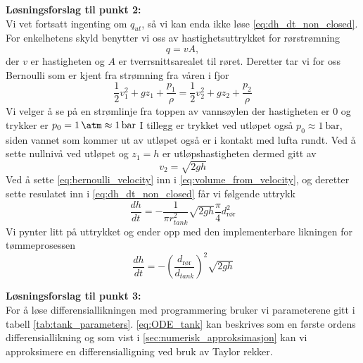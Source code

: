 \textbf{Løsningsforslag til punkt 2:} \\
Vi vet fortsatt ingenting om $q_{ut}$, så vi kan enda ikke løse \eqref{eq:dh_dt_non_closed}. For enkelhetens skyld benytter vi oss av hastighetsuttrykket for rørstrømning
\begin{equation}
    q = vA,
    \label{eq:volume_from_velocity}
\end{equation}
der $v$ er hastigheten og $A$ er tverrsnittsarealet til røret. Deretter tar vi for oss Bernoulli som er kjent fra strømning fra våren i fjor
\begin{equation}
    \frac{1}{2}v_1^2 + gz_1 + \frac{p_1}{\rho} = \frac{1}{2}v_2^2 + gz_2 + \frac{p_2}{\rho}
\end{equation}
Vi velger å se på en strømlinje fra toppen av vannsøylen der hastigheten er 0 og trykker er $p_0=\SI{1}{\atm}\approx \SI{1}{\bar}$ I tillegg er trykket ved utløpet også $p_0\approx \SI{1}{\bar}$, siden vannet som kommer ut av utløpet også er i kontakt med lufta rundt. Ved å sette nullnivå ved utløpet og $z_1=h$ er utløpshastigheten dermed gitt av 
\begin{equation}
    v_2 = \sqrt{2gh}
    \label{eq:bernoulli_velocity}
\end{equation}
Ved å sette \eqref{eq:bernoulli_velocity} inn i \eqref{eq:volume_from_velocity}, og deretter sette resulatet inn i \eqref{eq:dh_dt_non_closed} får vi følgende uttrykk
\begin{equation}
    \frac{dh}{dt} = -\frac{1}{\pi r_{tank}^2} \sqrt{2gh}\frac{\pi}{4}d_{\text{rør}}^2
\end{equation}
Vi pynter litt på uttrykket og ender opp med den implementerbare likningen for tømmeprosessen
\begin{equation}
    \frac{dh}{dt} = -\left(\frac{d_\text{rør}}{d_{tank}}\right)^2 \sqrt{2gh}
    \label{eq:ODE_tank}
\end{equation}

\textbf{Løsningsforslag til punkt 3:} \\
For å løse differensiallikningen med programmering bruker vi parameterene gitt i tabell \ref{tab:tank_parameters}. \cref{eq:ODE_tank} kan beskrives som en første ordens differensiallikning og som vist i \cref{sec:numerisk_approksimasjon} kan vi approksimere en differensialligning ved bruk av Taylor rekker. 

